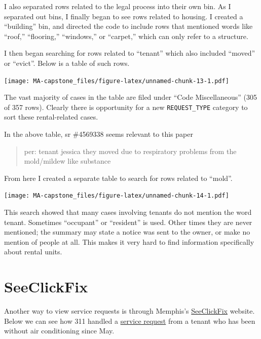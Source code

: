 \documentclass[
]{book}
\begin{document}
I also separated rows related to the legal process into their own bin. As I separated out bins, I finally began to see rows related to housing. I created a ``building'' bin, and directed the code to include rows that mentioned words like ``roof,'' ``flooring,'' ``windows,'' or ``carpet,'' which can only refer to a structure.

I then began searching for rows related to ``tenant'' which also included ``moved'' or ``evict''. Below is a table of such rows.

\texttt{[image: MA-capstone\_files/figure-latex/unnamed-chunk-13-1.pdf]}

The vast majority of cases in the table are filed under ``Code Miscellaneous'' (305 of 357 rows). Clearly there is opportunity for a new \texttt{REQUEST\_TYPE} category to sort these rental-related cases.

In the above table, sr \#4569338 seems relevant to this paper

\begin{quote}
per: tenant jessica they moved due to respiratory problems from the mold/mildew like substance
\end{quote}

From here I created a separate table to search for rows related to ``mold''.

\texttt{[image: MA-capstone\_files/figure-latex/unnamed-chunk-14-1.pdf]}

This search showed that many cases involving tenants do not mention the word tenant. Sometimes ``occupant'' or ``resident'' is used. Other times they are never mentioned; the summary may state a notice was sent to the owner, or make no mention of people at all. This makes it very hard to find information specifically about rental units.

\hypertarget{seeclickfix}{%
\section{SeeClickFix}\label{seeclickfix}}

Another way to view service requests is through Memphis's \href{https://seeclickfix.com/web_portal/DaM5B2x33WeFNJ1zpUeDRvCB/issues/map?lat=35.14896833842707\&lng=-90.05163922905923\&max_lat=35.15402992416014\&max_lng=-90.04691720008852\&min_lat=35.143906437842766\&min_lng=-90.05635857582094\&zoom=17}{SeeClickFix} website. Below we can see how 311 handled a \href{https://seeclickfix.com/web_portal/DaM5B2x33WeFNJ1zpUeDRvCB/issues/10508076}{service request} from a tenant who has been without air conditioning since May.
\end{document}
